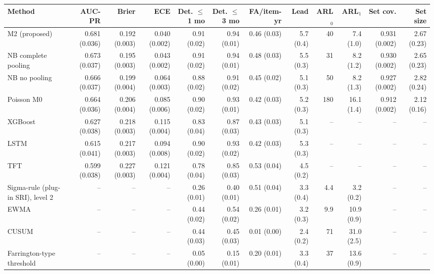 \documentclass[10pt,a4paper]{article}
\begin{document}
\begin{landscape}
\noindent\begin{minipage}{\linewidth}
\label{tab:S2-abrupt}
\centering\scriptsize
\begin{tabular}{lrrrrrrrrrrr}
\toprule
Method & AUC-PR & Brier & ECE & Det. $\le$1 mo & Det. $\le$3 mo & FA/item-yr & Lead & ARL$_0$ & ARL$_1$ & Set cov. & Set size \\ \midrule
M2 (proposed) & 0.681 (0.036) & 0.192 (0.003) & 0.040 (0.002) & 0.91 (0.02) & 0.94 (0.01) & 0.46 (0.03) & 5.7 (0.4) & 40 & 7.4 (1.0) & 0.931 (0.002) & 2.67 (0.23) \\
NB complete pooling & 0.673 (0.037) & 0.195 (0.003) & 0.043 (0.002) & 0.91 (0.02) & 0.94 (0.01) & 0.48 (0.03) & 5.5 (0.3) & 31 & 8.2 (1.2) & 0.930 (0.002) & 2.65 (0.23) \\
NB no pooling & 0.666 (0.037) & 0.199 (0.004) & 0.064 (0.003) & 0.88 (0.02) & 0.91 (0.02) & 0.45 (0.02) & 5.1 (0.3) & 50 & 8.2 (1.3) & 0.927 (0.002) & 2.82 (0.24) \\
Poisson M0 & 0.664 (0.036) & 0.206 (0.004) & 0.085 (0.006) & 0.90 (0.02) & 0.93 (0.01) & 0.42 (0.03) & 5.2 (0.3) & 180 & 16.1 (1.4) & 0.912 (0.002) & 2.12 (0.16) \\
XGBoost & 0.627 (0.038) & 0.218 (0.003) & 0.115 (0.004) & 0.83 (0.04) & 0.87 (0.03) & 0.43 (0.03) & 5.1 (0.3) & – & – & – & – \\
LSTM & 0.615 (0.041) & 0.217 (0.003) & 0.094 (0.008) & 0.90 (0.02) & 0.93 (0.02) & 0.42 (0.03) & 5.3 (0.3) & – & – & – & – \\
TFT & 0.599 (0.038) & 0.227 (0.003) & 0.121 (0.004) & 0.78 (0.04) & 0.85 (0.03) & 0.53 (0.04) & 4.5 (0.2) & – & – & – & – \\
Sigma-rule (plug-in SRI), level 2 & – & – & – & 0.26 (0.01) & 0.40 (0.01) & 0.51 (0.04) & 3.3 (0.4) & 4.4 & 3.2 (0.2) & – & – \\
EWMA & – & – & – & 0.44 (0.02) & 0.54 (0.02) & 0.26 (0.01) & 3.2 (0.3) & 9.9 & 10.9 (0.9) & – & – \\
CUSUM & – & – & – & 0.44 (0.03) & 0.45 (0.03) & 0.01 (0.00) & 2.4 (0.2) & 71 & 31.0 (2.5) & – & – \\
Farrington-type threshold & – & – & – & 0.05 (0.00) & 0.15 (0.01) & 0.20 (0.01) & 3.3 (0.4) & 37 & 13.6 (0.9) & – & – \\
\bottomrule
\end{tabular}
\par\vspace{3pt}{\scriptsize Stable windows are the 24 months before the change at month 60; ARL$_1$ is the delay from the change to the first (persistent) alarm.}
\end{minipage}
\vspace{22pt}
\end{landscape}
\end{document}
